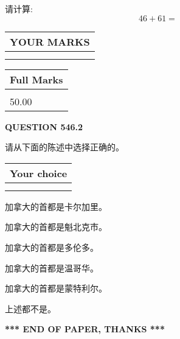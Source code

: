 \documentclass{ctexart}
\begin{document}
  
 
请计算:
\begin{equation}
46 +  %
61 = \nonumber
\end{equation}
 

 

 
  
\vspace{0.2in}
  
\noindent\begin{tabular}{|l|}
\hline
 YOUR MARKS  \\
\hline
 \\ 
 \\ 
\hline
\end{tabular}
\hspace{0.05in} \begin{tabular}{|l|}
\hline
 Full Marks  \\
\hline
 \\ 
50.00 \\
\hline
\end{tabular}
{\textbf{\Large{QUESTION
546.2 
}}}
  
  
请从下面的陈述中选择正确的。
  
  
\noindent\hspace{3.0in} \begin{tabular}{|l|}
\hline
Your choice \\
\hline
 \\ 
 \\ 
\hline
\end{tabular}
  
  
 
 
加拿大的首都是卡尔加里。
 
 
加拿大的首都是魁北克市。
 
 
加拿大的首都是多伦多。
 
 
加拿大的首都是温哥华。
 
 
加拿大的首都是蒙特利尔。
 
 
 上述都不是。
 
 
   
   
 \vspace{0.2in}
 
   
   
   
   
\vspace{1.0in} 
{\textbf{\large{ *** END OF PAPER, THANKS *** }}} 
   
\end{document}
